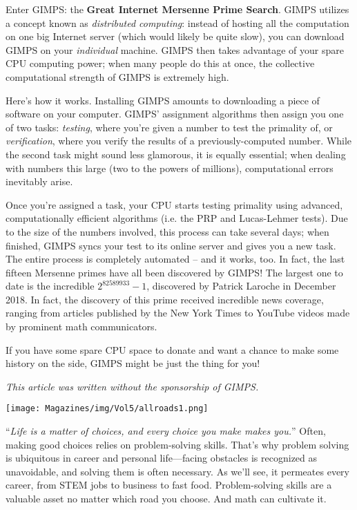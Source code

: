 \documentclass{article}
\begin{document}
\begin{multicols}{3}
Enter GIMPS: the \textbf{Great Internet Mersenne Prime Search}. GIMPS utilizes a concept known as \textit{distributed computing}: instead of hosting all the computation on one big Internet server (which would likely be quite slow), you can download GIMPS on your \textit{individual} machine. GIMPS then takes advantage of your spare CPU computing power; when many people do this at once, the collective computational strength of GIMPS is extremely high.

Here’s how it works. Installing GIMPS amounts to downloading a piece of software on your computer. GIMPS’ assignment algorithms then assign you one of two tasks: \textit{testing}, where you’re given a number to test the primality of, or \textit{verification}, where you verify the results of a previously-computed number.  While the second task might sound less glamorous, it is equally essential; when dealing with numbers this large (two to the powers of millions), computational errors inevitably arise. 

Once you’re assigned a task, your CPU starts testing primality using advanced, computationally efficient algorithms (i.e. the PRP and Lucas-Lehmer tests). Due to the size of the numbers involved, this process can take several days; when finished, GIMPS syncs your test to its online server and gives you a new task. The entire process is completely automated – and it works, too. In fact, the last fifteen Mersenne primes have all been discovered by GIMPS! The largest one to date is the incredible $2^{82589933}-1$, discovered by Patrick Laroche in December 2018. In fact, the discovery of this prime received incredible news coverage, ranging from articles published by the New York Times to YouTube videos made by prominent math communicators.

If you have some spare CPU space to donate and want a chance to make some history on the side, GIMPS might be just the thing for you!
 
\textit{This article was written without the sponsorship of GIMPS.}
\closearticle


\begin{center}
    \texttt{[image: Magazines/img/Vol5/allroads1.png]}
\end{center}

“\textit{Life is a matter of choices, and every choice you make makes you.}” Often, making good choices relies on problem-solving skills. That’s why problem solving is ubiquitous in career and personal life—facing obstacles is recognized as unavoidable, and solving them is often necessary. As we’ll see, it permeates every career, from STEM jobs to business to fast food. Problem-solving skills are a valuable asset no matter which road you choose. And math can cultivate it.


\end{multicols}
\end{document}

